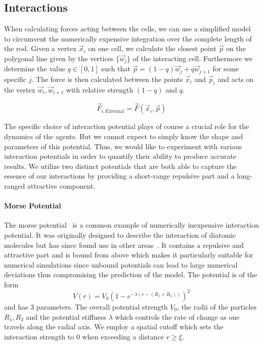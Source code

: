 \documentclass{article}
\begin{document}
\subsection{Interactions}

When calculating forces acting between the cells, we can use a simplified model to circumvent the
numerically expensive integration over the complete length of the rod.
Given a vertex $\vec{x}_i$ on one cell, we calculate the closest point $\vec{p}$ on the polygonal
line given by the vertices $\{\vec{w}_j\}$ of the interacting cell.
Furthermore we determine the value $q\in[0,1]$ such that $\vec{p} = (1-q)\vec{w}_j + q\vec{w}_{j+1}$
for some specific $j$.
The force is then calculated between the points $\vec{x}_i$ and $\vec{p}_i$ and acts on
the vertex $\vec{w}_i,\vec{w}_{i+1}$ with relative strength $(1-q)$ and $q$.

\begin{equation}
    \vec{F}_{i,\text{External}} = \vec{F}(\vec{x}_i,\vec{p})
    \label{eq:cell-force-external}
\end{equation}

The specific choice of interaction potential plays of course a crucial role for the dynamics of the
agents.
But we cannot expect to simply know the shape and parameters of this potential.
Thus, we would like to experiment with various interaction potentials in order to quantify their
ability to produce accurate results.
We utilize two distinct potentials that are both able to capture the essence of our interactions by
providing a short-range repulsive part and a long-ranged attractive component.

\paragraph{Morse Potential}
The morse potential~\cite{Morse1929} is a common example of numerically inexpensive interaction
potential.
It was originally designed to describe the interaction of diatomic molecules but has since found use
in other areas~\cite{Breitwieser2021}.
It contains a repulsive and attractive part and is bound from above which makes it particularly
suitable for numerical simulations since unbound potentials can lead to large numerical deviations
thus compromising the prediction of the model.
The potential is of the form
\begin{equation}
    V(r) = V_0\left(1-e^{-\lambda(r-(R_1+R_2))}\right)^2
\end{equation}
and has 3 parameters.
The overall potential strength $V_0$, the radii of the particles $R_1,R_2$ and the potential
stiffness $\lambda$ which controls the rate of change as one travels along the radial axis.
We employ a spatial cutoff which sets the interaction strength to $0$ when exceeding a distance
$r\geq\xi$.
\end{document}
